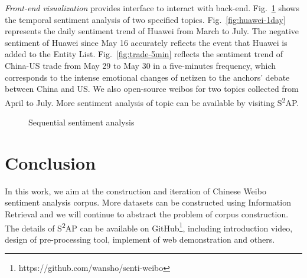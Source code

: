 \documentclass[runningheads]{llncs}
\begin{document}
\textit{Front-end visualization} provides interface to interact with back-end. Fig.~\ref{fig:sentiment-trend} shows the temporal sentiment analysis of two specified topics. Fig.~\ref{fig:huawei-1day} represents the daily sentiment trend of Huawei from March to July. The negative sentiment of Huawei since May 16 accurately reflects the event that Huawei is added to the Entity List. Fig.~\ref{fig:trade-5min} reflects the sentiment trend of China-US trade from May 29 to May 30 in a five-minutes frequency, which corresponds to the intense emotional changes of netizen to the anchors' debate between China and US. We also open-source weibos for two topics collected from April to July. More sentiment analysis of topic can be available by visiting S\textsuperscript{2}AP. 

\begin{figure}[ht]
\vspace{-0.5cm}  %
\centering  %
\caption{Sequential sentiment analysis}
\label{fig:sentiment-trend}
\end{figure}

\section{Conclusion}
 In this work, we aim at the construction and iteration of Chinese Weibo sentiment analysis corpus. More datasets can be constructed using Information Retrieval and we will continue to abstract the problem of corpus construction. The details of S\textsuperscript{2}AP can be available on GitHub\footnote{https://github.com/wansho/senti-weibo}, including introduction video, design of pre-processing tool, implement of web demonstration and others. 
 


\end{document}
